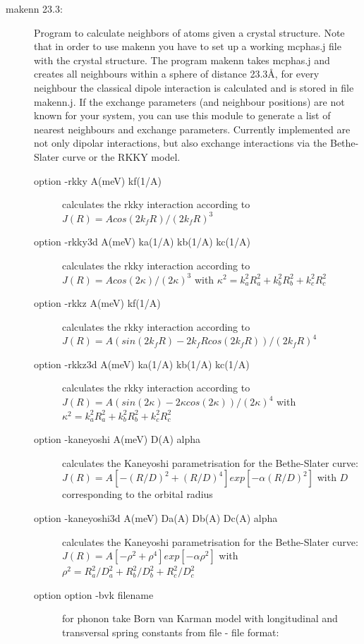 \begin{description}
\item[\prg makenn 23.3:] Program to calculate neighbors of atoms given a crystal structure.
Note that in order to use {\prg makenn} you have to set up a 
working {\prg mcphas.j} file with the crystal structure. 
The program {\prg makenn} takes {\prg mcphas.j} and
creates all neighbours within a sphere of distance 23.3\AA, for every neighbour the classical
dipole interaction is calculated and is stored in file {\prg makenn.j}. If the exchange %
parameters 
(and neighbour positions) are not known for your system, you can use this module 
to generate a list of nearest neighbours and exchange parameters. Currently implemented 
 are not only dipolar interactions, but also exchange interactions via the Bethe-Slater 
curve or the RKKY model. 
\begin{description}
\item[option {\prg -rkky A(meV) kf(1/A)}] calculates the rkky interaction according to $J(R)=A %
cos(2 k_f R)/(2 k_f R)^3$
\item[option {\prg -rkky3d A(meV) ka(1/A) kb(1/A) kc(1/A)}] calculates the rkky interaction %
according to $J(R)=A cos(2 \kappa)/(2 \kappa)^3$ with $\kappa^2=k_a^2 R_a^2 + k_b^2 R_b^2 + %
k_c^2 R_c^2$
\item[option {\prg -rkkz A(meV) kf(1/A)}] calculates the rkky interaction according to $J(R)=A %
(sin(2 k_f R)- 2 k_f R cos(2 k_f R))/(2 k_f R)^4$
\item[option {\prg -rkkz3d A(meV) ka(1/A) kb(1/A) kc(1/A)}] calculates the rkky interaction %
according to $J(R)=A (sin(2 \kappa)- 2 \kappa cos(2 \kappa))/(2 \kappa)^4$ with $\kappa^2=k_a^2 %
R_a^2 + k_b^2 R_b^2 + k_c^2 R_c^2$
\item[option {\prg -kaneyoshi A(meV) D(A) alpha}] calculates the Kaneyoshi parametrisation for %
the Bethe-Slater
                               curve: $J(R)= A [-(R/D)^2+(R/D)^4]exp[-\alpha (R/D)^2]$  with $D$ %
corresponding
                               to the orbital radius
\item[option {\prg -kaneyoshi3d A(meV) Da(A) Db(A) Dc(A) alpha}] calculates the Kaneyoshi %
parametrisation for the Bethe-Slater
                               curve: $J(R)= A [-\rho^2+\rho^4]exp[-\alpha \rho^2]$  with %
$\rho^2=R_a^2/D_a^2+R_b^2/D_b^2+R_c^2/D_c^2$
\item[option {\prg option -bvk filename}]
              for phonon take Born van Karman model with longitudinal and
              transversal spring constants from file - file format:

\end{description}
\end{description}
